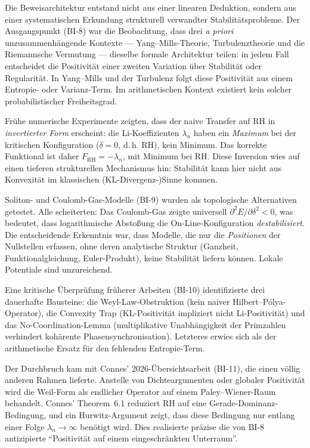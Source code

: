\documentclass[12pt,a4paper]{article}
\theoremstyle{definition}
\theoremstyle{remark}
\begin{document}
Die Beweisarchitektur entstand nicht aus einer linearen Deduktion, sondern aus einer systematischen Erkundung strukturell verwandter Stabilitätsprobleme. Der Ausgangspunkt (BI-8) war die Beobachtung, dass drei \emph{a priori} unzusammenhängende Kontexte --- Yang--Mills-Theorie, Turbulenztheorie und die Riemannsche Vermutung --- dieselbe formale Architektur teilen: in jedem Fall entscheidet die Positivität einer zweiten Variation über Stabilität oder Regularität. In Yang--Mills und der Turbulenz folgt diese Positivität aus einem Entropie- oder Varianz-Term. Im arithmetischen Kontext existiert kein solcher probabilistischer Freiheitsgrad.

Frühe numerische Experimente zeigten, dass der naive Transfer auf RH in \emph{invertierter Form} erscheint: die Li-Koeffizienten $\lambda_n$ haben ein \emph{Maximum} bei der kritischen Konfiguration ($\delta = 0$, d.\,h. RH), kein Minimum. Das korrekte Funktional ist daher $F_{\mathrm{RH}} = -\lambda_n$, mit Minimum bei RH. Diese Inversion wies auf einen tieferen strukturellen Mechanismus hin: Stabilität kann hier nicht aus Konvexität im klassischen (KL-Divergenz-)Sinne kommen.

Soliton- und Coulomb-Gas-Modelle (BI-9) wurden als topologische Alternativen getestet. Alle scheiterten: Das Coulomb-Gas zeigte universell $\partial^2 E/\partial\delta^2 < 0$, was bedeutet, dass logarithmische Abstoßung die On-Line-Konfiguration \emph{destabilisiert}. Die entscheidende Erkenntnis war, dass Modelle, die nur die \emph{Positionen} der Nullstellen erfassen, ohne deren analytische Struktur (Ganzheit, Funktionalgleichung, Euler-Produkt), keine Stabilität liefern können. Lokale Potentiale sind unzureichend.

Eine kritische Überprüfung früherer Arbeiten (BI-10) identifizierte drei dauerhafte Bausteine: die Weyl-Law-Obstruktion (kein naiver Hilbert--P\'olya-Operator), die Convexity Trap (KL-Positivität impliziert nicht Li-Positivität) und das No-Coordination-Lemma (multiplikative Unabhängigkeit der Primzahlen verhindert kohärente Phasensynchronisation). Letzteres erwies sich als der arithmetische Ersatz für den fehlenden Entropie-Term.

Der Durchbruch kam mit Connes' 2026-Übersichtsarbeit \cite{Connes2025} (BI-11), die einen völlig anderen Rahmen lieferte. Anstelle von Dichteargumenten oder globaler Positivität wird die Weil-Form als endlicher Operator auf einem Paley--Wiener-Raum behandelt. Connes' Theorem~6.1 reduziert RH auf eine Gerade-Dominanz-Bedingung, und ein Hurwitz-Argument zeigt, dass diese Bedingung nur entlang einer Folge $\lambda_n \to \infty$ benötigt wird. Dies realisierte präzise die von BI-8 antizipierte ``Positivität auf einem eingeschränkten Unterraum''.
\end{document}
